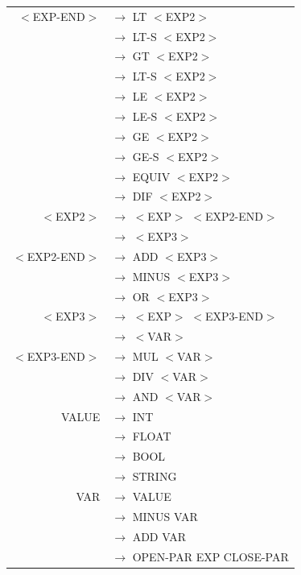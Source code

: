\documentclass[a4paper,10pt]{article}
\begin{document}
\begin{tabular}{rl}
					
$<$EXP-END$>$		& $\rightarrow$ LT $<$EXP2$>$\\
					& $\rightarrow$ LT-S $<$EXP2$>$\\
					& $\rightarrow$ GT $<$EXP2$>$\\
					& $\rightarrow$ LT-S $<$EXP2$>$\\
					& $\rightarrow$ LE $<$EXP2$>$\\
					& $\rightarrow$ LE-S $<$EXP2$>$\\
					& $\rightarrow$ GE $<$EXP2$>$\\
					& $\rightarrow$ GE-S $<$EXP2$>$\\
					& $\rightarrow$ EQUIV $<$EXP2$>$\\
					& $\rightarrow$ DIF $<$EXP2$>$\\
										
					
$<$EXP2$>$			& $\rightarrow$ $<$EXP$>$ $<$EXP2-END$>$\\
					& $\rightarrow$ $<$EXP3$>$\\
					
$<$EXP2-END$>$		& $\rightarrow$  ADD $<$EXP3$>$\\
					& $\rightarrow$  MINUS $<$EXP3$>$\\
					& $\rightarrow$  OR $<$EXP3$>$\\					

					
$<$EXP3$>$			& $\rightarrow$ $<$EXP$>$ $<$EXP3-END$>$\\
					& $\rightarrow$ $<$VAR$>$\\
					
$<$EXP3-END$>$		& $\rightarrow$ MUL $<$VAR$>$\\
					& $\rightarrow$ DIV $<$VAR$>$\\
					& $\rightarrow$ AND $<$VAR$>$\\

VALUE				& $\rightarrow$ INT \\
					& $\rightarrow$ FLOAT \\
					& $\rightarrow$ BOOL \\
					& $\rightarrow$ STRING \\
					
VAR					& $\rightarrow$ VALUE \\
					& $\rightarrow$ MINUS VAR\\
					& $\rightarrow$ ADD VAR \\
					& $\rightarrow$ OPEN-PAR EXP CLOSE-PAR \\

\end{tabular}
\end{document}
